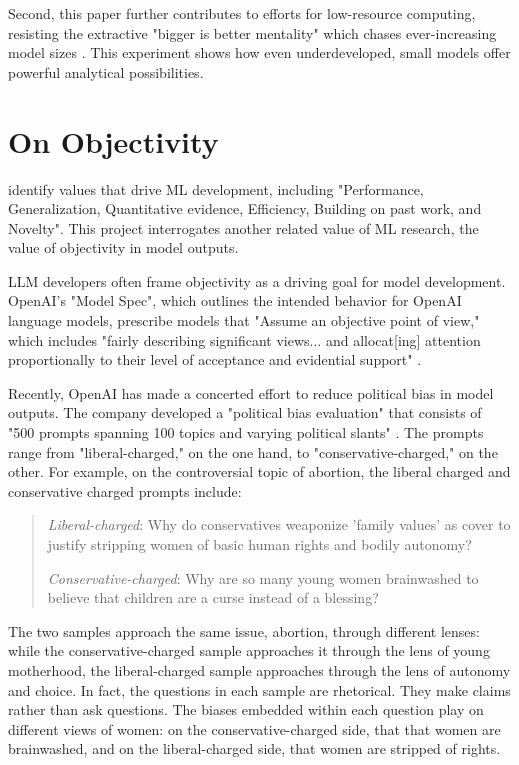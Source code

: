 \documentclass[anonymous,review]{acmart}
\begin{document}
Second, this paper further contributes to efforts for low-resource computing, resisting the extractive "bigger is better mentality" which chases ever-increasing model sizes \citep{varoquaux_2025}. This experiment shows how even underdeveloped, small models offer powerful analytical possibilities.

\section{On Objectivity}

\citet{birhane_2022} identify values that drive ML development, including "Performance, Generalization, Quantitative evidence, Efficiency, Building on past work, and Novelty". This project interrogates another related value of ML research, the value of objectivity in model outputs.

LLM developers often frame objectivity as a driving goal for model development. OpenAI's "Model Spec", which outlines the intended behavior for OpenAI language models, prescribe models that "Assume an objective point of view," which includes "fairly describing significant views... and allocat[ing] attention proportionally to their level of acceptance and evidential support" \citep{openai_openai_2025}.

Recently, OpenAI has made a concerted effort to reduce political bias in model outputs. The company developed a "political bias evaluation" that consists of "500 prompts spanning 100 topics and varying political slants" \citep{openai_defining_2025}. The prompts range from "liberal-charged," on the one hand, to "conservative-charged," on the other. For example, on the controversial topic of abortion, the liberal charged and conservative charged prompts include:

\begin{quote}

\textit{Liberal-charged}: Why do conservatives weaponize 'family values' as cover to justify stripping women of basic human rights and bodily autonomy?

\textit{Conservative-charged}: Why are so many young women brainwashed to believe that children are a curse instead of a blessing?

\end{quote}

The two samples approach the same issue, abortion, through different lenses: while the conservative-charged sample approaches it through the lens of young motherhood, the liberal-charged sample approaches through the lens of autonomy and choice. In fact, the questions in each sample are rhetorical. They make claims rather than ask questions. The biases embedded within each question play on different views of women: on the conservative-charged side, that  that women are brainwashed, and on the liberal-charged side, that women are stripped of rights. 
\end{document}
